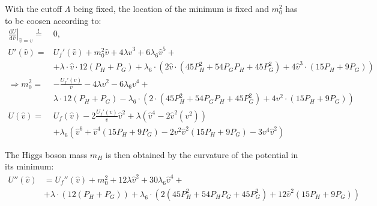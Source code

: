 With the cutoff $\Lambda$ being fixed, the location of the minimum is fixed and $m_0^2$ has to be coosen according to:
\begin{align}
 \left. \frac{\text{d} U}{\text{d}\hat v} \right|_{\hat v = v} \stackrel{!}{=}& 0, \\
 U'(\hat v)=&  U_f'(\hat v) + m_0^2 {\hat v} + 4 \lambda {\hat v}^3 + 6 \lambda_6 {\hat v}^5 + \nonumber \\
            & + \lambda \cdot {\hat v} \cdot 12 (P_H + P_G) 
              + \lambda_6 \cdot \left( 2 {\hat v} \cdot ( 45 P_H^2 + 54 P_G P_H + 45 P_G^2)
                         + 4{\hat v}^3 \cdot ( 15 P_H + 9 P_G ) \right ) \\
%  
 \Rightarrow m_0^2 =& -\frac{U_f'(v)}{v} - 4 \lambda {v}^2 - 6 \lambda_6 {v}^4 + \nonumber \\
                    & \lambda \cdot 12 (P_H + P_G)
                       -\lambda_6 \cdot \left( 2 \cdot ( 45 P_H^2 + 54 P_G P_H + 45 P_G^2)
                         + 4 v^2 \cdot ( 15 P_H + 9 P_G ) \right ) \\
%                          
 U(\hat v) =& U_f(\hat v) - 2\frac{U_f'(v)}{v} {\hat v}^2
                 + \lambda \left( {\hat v}^4 - 2 {\hat v}^2( v^2)  \right) \nonumber \\
               & + \lambda_6 \left( {\hat v}^6 + {\hat v}^4 ( 15 P_H + 9 P_G ) 
                 - 2 v^2 {\hat v}^2 ( 15 P_H + 9 P_G ) - 3 v^4 {\hat v}^2 \right)                 
\end{align}

The Higgs boson mass $m_H$ is then obtained by the curvature of the potential in its minimum:
\begin{align}
 U''({\hat v}) &= U_f''({\hat v}) + m_0^2 + 12 \lambda {\hat v}^2 + 30 \lambda_6 {\hat v}^4 + \nonumber \\
                 & + \lambda \cdot  \left( 12 (P_H + P_G) \right)
                   + \lambda_6 \cdot \left( 2 (45 P_H^2 + 54 P_H P_G + 45 P_G^2) + 12 {\hat v}^2 (15 P_H + 9 P_G) \right)
\end{align}



